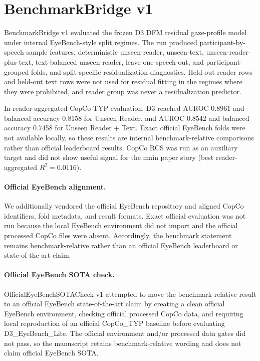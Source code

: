 \section{BenchmarkBridge v1}
BenchmarkBridge v1 evaluated the frozen D3 DFM residual gaze-profile model under
internal EyeBench-style split regimes. The run produced participant-by-speech sample
features, deterministic unseen-reader, unseen-text, unseen-reader-plus-text,
text-balanced unseen-reader, leave-one-speech-out, and participant-grouped folds, and
split-specific residualization diagnostics. Held-out reader rows and held-out text rows
were not used for residual fitting in the regimes where they were prohibited, and
reader group was never a residualization predictor.

In reader-aggregated CopCo TYP evaluation, D3 reached AUROC 0.8961 and balanced
accuracy 0.8158 for Unseen Reader, and AUROC 0.8542 and balanced accuracy 0.7458 for
Unseen Reader + Text. Exact official EyeBench folds were not available locally, so
these results are internal benchmark-relative comparisons rather than official
leaderboard results. CopCo RCS was run as an auxiliary target and did not show useful
signal for the main paper story (best reader-aggregated $R^2=0.0116$).

\paragraph{Official EyeBench alignment.}
We additionally vendored the official EyeBench repository and aligned CopCo identifiers, fold metadata, and result formats. Exact official evaluation was not run because the local EyeBench environment did not import and the official processed CopCo files were absent. Accordingly, the benchmark statement remains benchmark-relative rather than an official EyeBench leaderboard or state-of-the-art claim.

\paragraph{Official EyeBench SOTA check.}
OfficialEyeBenchSOTACheck v1 attempted to move the benchmark-relative result to an official EyeBench state-of-the-art claim by creating a clean official EyeBench environment, checking official processed CopCo data, and requiring local reproduction of an official CopCo_TYP baseline before evaluating D3_EyeBench_Lite. The official environment and/or processed data gates did not pass, so the manuscript retains benchmark-relative wording and does not claim official EyeBench SOTA.

